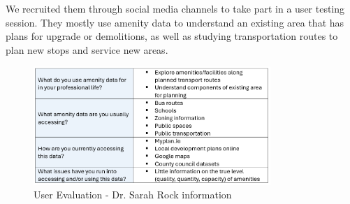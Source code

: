 We recruited them through social media channels to take part in a user testing
session. They mostly use amenity data to understand an existing area that has
plans for upgrade or demolitions, as well as studying transportation routes to
plan new stops and service new areas.
\begin{figure}[h!]
    \centering
    \includegraphics[width=0.8\textwidth]{images/sarah-amenity-info.png}
    \caption{User Evaluation - Dr. Sarah Rock information}
\end{figure}

